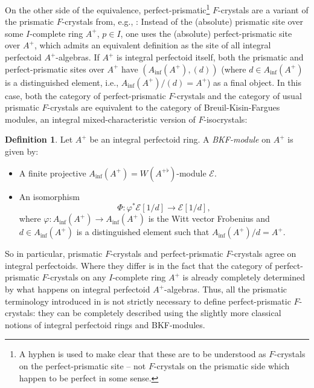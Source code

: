 \documentclass[10pt,twoside]{article}
\numberwithin{equation}{section}
\theoremstyle{plain}
\theoremstyle{definition}
\newtheorem{mydef}[mythm]{Definition}
\newcommand{\MCE}{\mathcal{E}}
\let \phi \varphi
\DeclareMathOperator{\Inf}{inf}
\newcommand{\Ainf}{A_{\Inf}}
\begin{document}
On the other side of the equivalence, perfect-prismatic\footnote{A hyphen is used to make clear that these are to be understood as \(F\)-crystals on the perfect-prismatic site -- not \(F\)-crystals on the prismatic side which happen to be perfect in some sense.} \(F\)-crystals are a variant of the prismatic \(F\)-crystals from, e.g., \cite[Definition 4.1]{BS21b}: Instead of the (absolute) prismatic site over some \(I\)-complete ring \(A^+\), \(p\in I\), one uses the (absolute) perfect-prismatic site over \(A^+\), which admits an equivalent definition as the site of all integral perfectoid \(A^+\)-algebras. If \(A^+\) is integral perfectoid itself, both the prismatic and perfect-prismatic sites over \(A^+\) have \((\Ainf(A^+),(d))\) (where \(d\in \Ainf(A^+)\) is a distinguished element, i.e., \(\Ainf(A^+)/(d)=A^+\)) as a final object. In this case, both the category of perfect-prismatic \(F\)-crystals and the category of usual prismatic \(F\)-crystals are equivalent to the category of Breuil-Kisin-Fargues modules, an integral mixed-characteristic version of \(F\)-isocrystals:
\begin{mydef}
    Let \(A^+\) be an integral perfectoid ring. A \emph{BKF-module} on \(A^+\) is given by:
    \begin{itemize}
        \item A finite projective \(\Ainf(A^+)=W(A^{+\flat})\)-module \(\MCE\).
        \item An isomorphism 
        \[\Phi\colon\phi^*\MCE[1/d]\longrightarrow\MCE[1/d],\]
        where \(\phi\colon \Ainf(A^+)\to \Ainf(A^+)\) is the Witt vector Frobenius and \(d\in \Ainf(A^+)\) is a distinguished element such that \(\Ainf(A^+)/d=A^+\).
    \end{itemize}
\end{mydef}
So in particular, prismatic \(F\)-crystals and perfect-prismatic \(F\)-crystals agree on integral perfectoids. Where they differ is in the fact that the category of perfect-prismatic \(F\)-crystals on any \(I\)-complete ring \(A^+\) is already completely determined by what happens on integral perfectoid \(A^+\)-algebras. Thus, all the prismatic terminology introduced in \cite{BS21} is not strictly necessary to define perfect-prismatic \(F\)-crystals: they can be completely described using the slightly more classical notions of integral perfectoid rings and BKF-modules.
\end{document}
